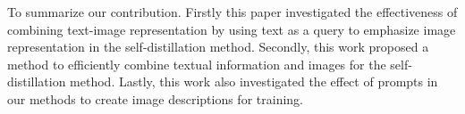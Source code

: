 To summarize our contribution.
Firstly this paper investigated the effectiveness of combining text-image representation by using text as a query to emphasize image representation in the self-distillation method.
Secondly, this work proposed a method to efficiently combine textual information and images for the self-distillation method.
Lastly, this work also investigated the effect of prompts in our methods to create image descriptions for training.





